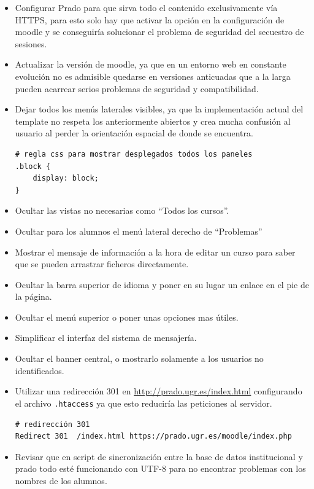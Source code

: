 \begin{itemize}
	\item Configurar Prado para que sirva todo el contenido exclusivamente vía HTTPS, para esto solo hay que activar la opción en la configuración de moodle y se conseguiría solucionar el problema de seguridad del secuestro de sesiones.

	\item Actualizar la versión de moodle, ya que en un entorno web en constante evolución no es admisible quedarse en versiones anticuadas que a la larga pueden acarrear serios problemas de seguridad y compatibilidad.

	\item Dejar todos los menús laterales visibles, ya que la implementación actual del template no respeta los anteriormente abiertos y crea mucha confusión al usuario al perder la orientación espacial de donde se encuentra.
\begin{lstlisting}[language=html]
# regla css para mostrar desplegados todos los paneles
.block {
	display: block;
}
\end{lstlisting}

	\item Ocultar las vistas no necesarias como ``Todos los cursos''.
	\item Ocultar para los alumnos el menú lateral derecho de ``Problemas''
	\item Mostrar el mensaje de información a la hora de editar un curso para saber que se pueden arrastrar ficheros directamente.
	\item Ocultar la barra superior de idioma y poner en su lugar un enlace en el pie de la página.
	\item Ocultar el menú superior o poner unas opciones mas útiles.
	\item Simplificar el interfaz del sistema de mensajería.
	\item Ocultar el banner central, o mostrarlo solamente a los usuarios no identificados.
	\item Utilizar una redirección 301 en \url{http://prado.ugr.es/index.html} configurando el archivo \texttt{.htaccess} ya que esto reduciría las peticiones al servidor.
\begin{lstlisting}
# redirección 301
Redirect 301  /index.html https://prado.ugr.es/moodle/index.php
\end{lstlisting}
	
	\item Revisar que en script de sincronización entre la base de datos institucional y prado todo esté funcionando con UTF-8 para no encontrar problemas con los nombres de los alumnos.



\end{itemize}
